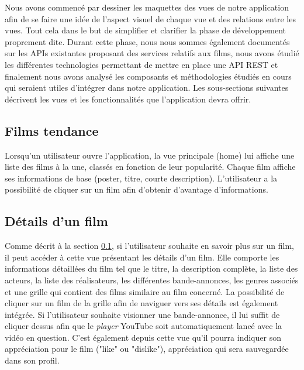 Nous avons commencé par dessiner les maquettes des vues de notre application afin de se faire une idée de l'aspect visuel de chaque vue et des relations entre les vues. Tout cela dans le but de simplifier et clarifier la phase de développement proprement dite.
Durant cette phase, nous nous sommes également documentés sur les APIs existantes proposant des services relatifs aux films, nous avons étudié les différentes technologies permettant de mettre en place une API REST et finalement nous avons analysé les composants et méthodologies étudiés en cours qui seraient utiles d'intégrer dans notre application.
Les sous-sections suivantes décrivent les vues et les fonctionnalités que l'application devra offrir.

\subsection{Films tendance}\label{films-tendance}
Lorsqu'un utilisateur ouvre l'application, la vue principale (home) lui affiche une liste des films à la une, classés en fonction de leur popularité. Chaque film affiche ses informations de base (poster, titre, courte description). L'utilisateur a la possibilité de cliquer sur un film afin d'obtenir d'avantage d'informations.


\subsection{Détails d'un film}
Comme décrit à la section \ref{films-tendance}, si l'utilisateur souhaite en savoir plus sur un film, il peut accéder à cette vue présentant les détails d'un film. Elle comporte les informations détaillées du film tel que le titre, la description complète, la liste des acteurs, la liste des réalisateurs, les différentes bande-annonces, les genres associés et une grille qui contient des films similaire au film concerné. La possibilité de cliquer sur un film de la grille afin de naviguer vers ses détails est également intégrée.
Si l'utilisateur souhaite visionner une bande-annonce, il lui suffit de cliquer dessus afin que le \textit{player} YouTube soit automatiquement lancé avec la vidéo en question.
C'est également depuis cette vue qu'il pourra indiquer son appréciation pour le film ("like" ou "dislike"), appréciation qui sera sauvegardée dans son profil.



